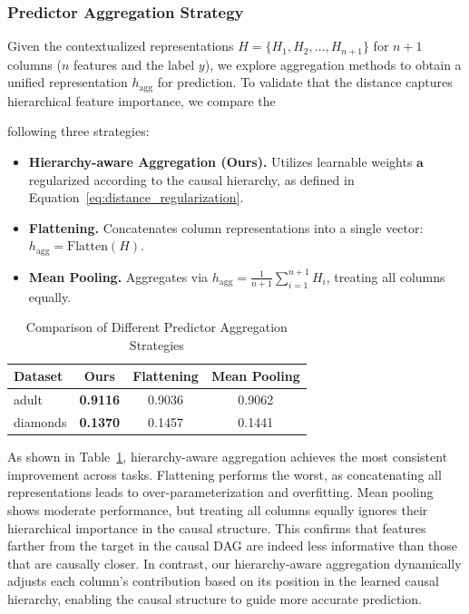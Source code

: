 \documentclass[sigconf, nonacm]{acmart}
\newcommand{\rln}[1]{{\color{black}#1}}
\newcommand{\syadd}[1]{{\color{black}#1}}
\newcommand{\syne}[1]{{\color{black}#1}}
\newcommand{\vldb}[1]{{\color{red}#1}}
\begin{document}
\subsubsection{Predictor Aggregation Strategy}
Given the contextualized representations $H = \{H_1, H_2, \ldots, H_{n+1}\}$ for $n{+}1$ columns ($n$ features and the label $y$), we explore aggregation methods to obtain a unified representation $h_{\text{agg}}$ for prediction. To validate that the distance captures hierarchical feature importance, we compare the \vldb{following three strategies:

\begin{itemize}
    \item \textbf{Hierarchy-aware Aggregation (Ours).} Utilizes learnable weights $\mathbf{a}$ regularized according to the causal hierarchy, as defined in Equation~\ref{eq:distance_regularization}.
    
    \item \textbf{Flattening.} Concatenates column representations into a single vector: $h_{\text{agg}} = \text{Flatten}(H)$.
    
    \item \textbf{Mean Pooling.} Aggregates via $h_{\text{agg}} = \frac{1}{n+1}\sum_{i=1}^{n+1} H_i$, treating all columns equally.
\end{itemize}
}
\begin{table}[h]
    \centering
    \small
    \caption{Comparison of Different Predictor Aggregation Strategies}
    \label{tab:predictor_comparison}
    \begin{tabular}{lccc}
        \toprule
        Dataset & Ours & Flattening & Mean Pooling \\
        \midrule
        adult   & \syne{\textbf{0.9116}} & \syne{0.9036} & \syne{0.9062} \\
        diamonds & \syne{\textbf{0.1370}} & \syne{0.1457} & \syne{0.1441} \\
        \bottomrule
    \end{tabular}
\end{table}


\syadd{As shown in Table~\ref{tab:predictor_comparison}, hierarchy-aware aggregation achieves the most consistent improvement across tasks.} \rln{Flattening performs the worst, as concatenating all representations leads to over-parameterization and overfitting. Mean pooling shows moderate performance, but treating all columns equally ignores their hierarchical importance in the causal structure. \syadd{This confirms that features farther from the target in the causal DAG are indeed less informative than those that are causally closer.} In contrast, our hierarchy-aware aggregation dynamically adjusts each column's contribution based on its position in the learned causal hierarchy, enabling the causal structure to guide more accurate prediction.
}
\end{document}
